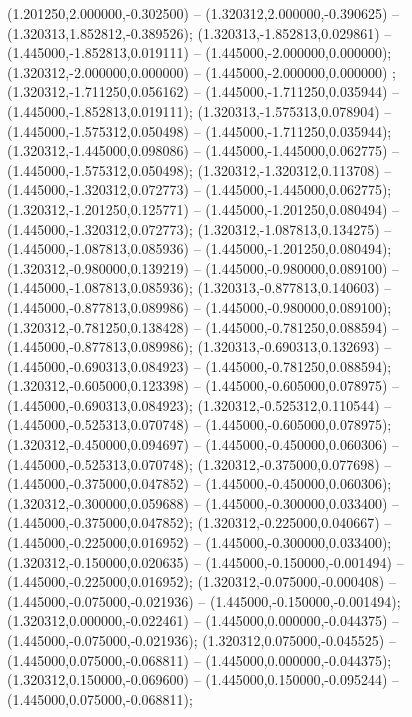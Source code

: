  (1.201250,2.000000,-0.302500) -- (1.320312,2.000000,-0.390625) -- (1.320313,1.852812,-0.389526);
 (1.320313,-1.852813,0.029861) -- (1.445000,-1.852813,0.019111) -- (1.445000,-2.000000,0.000000);
 (1.320312,-2.000000,0.000000) -- (1.445000,-2.000000,0.000000) ;
 (1.320312,-1.711250,0.056162) -- (1.445000,-1.711250,0.035944) -- (1.445000,-1.852813,0.019111);
 (1.320313,-1.575313,0.078904) -- (1.445000,-1.575312,0.050498) -- (1.445000,-1.711250,0.035944);
 (1.320312,-1.445000,0.098086) -- (1.445000,-1.445000,0.062775) -- (1.445000,-1.575312,0.050498);
 (1.320312,-1.320312,0.113708) -- (1.445000,-1.320312,0.072773) -- (1.445000,-1.445000,0.062775);
 (1.320312,-1.201250,0.125771) -- (1.445000,-1.201250,0.080494) -- (1.445000,-1.320312,0.072773);
 (1.320312,-1.087813,0.134275) -- (1.445000,-1.087813,0.085936) -- (1.445000,-1.201250,0.080494);
 (1.320312,-0.980000,0.139219) -- (1.445000,-0.980000,0.089100) -- (1.445000,-1.087813,0.085936);
 (1.320313,-0.877813,0.140603) -- (1.445000,-0.877813,0.089986) -- (1.445000,-0.980000,0.089100);
 (1.320312,-0.781250,0.138428) -- (1.445000,-0.781250,0.088594) -- (1.445000,-0.877813,0.089986);
 (1.320313,-0.690313,0.132693) -- (1.445000,-0.690313,0.084923) -- (1.445000,-0.781250,0.088594);
 (1.320312,-0.605000,0.123398) -- (1.445000,-0.605000,0.078975) -- (1.445000,-0.690313,0.084923);
 (1.320312,-0.525312,0.110544) -- (1.445000,-0.525313,0.070748) -- (1.445000,-0.605000,0.078975);
 (1.320312,-0.450000,0.094697) -- (1.445000,-0.450000,0.060306) -- (1.445000,-0.525313,0.070748);
 (1.320312,-0.375000,0.077698) -- (1.445000,-0.375000,0.047852) -- (1.445000,-0.450000,0.060306);
 (1.320312,-0.300000,0.059688) -- (1.445000,-0.300000,0.033400) -- (1.445000,-0.375000,0.047852);
 (1.320312,-0.225000,0.040667) -- (1.445000,-0.225000,0.016952) -- (1.445000,-0.300000,0.033400);
 (1.320312,-0.150000,0.020635) -- (1.445000,-0.150000,-0.001494) -- (1.445000,-0.225000,0.016952);
 (1.320312,-0.075000,-0.000408) -- (1.445000,-0.075000,-0.021936) -- (1.445000,-0.150000,-0.001494);
 (1.320312,0.000000,-0.022461) -- (1.445000,0.000000,-0.044375) -- (1.445000,-0.075000,-0.021936);
 (1.320312,0.075000,-0.045525) -- (1.445000,0.075000,-0.068811) -- (1.445000,0.000000,-0.044375);
 (1.320312,0.150000,-0.069600) -- (1.445000,0.150000,-0.095244) -- (1.445000,0.075000,-0.068811);
